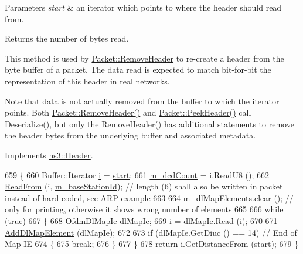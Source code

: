\begin{DoxyParams}{Parameters}
{\em start} & an iterator which points to where the header should read from. \\
\hline
\end{DoxyParams}
\begin{DoxyReturn}{Returns}
the number of bytes read.
\end{DoxyReturn}
This method is used by \hyperlink{classns3_1_1Packet_a0961eccf975d75f902d40956c93ba63e}{Packet\+::\+Remove\+Header} to re-\/create a header from the byte buffer of a packet. The data read is expected to match bit-\/for-\/bit the representation of this header in real networks.

Note that data is not actually removed from the buffer to which the iterator points. Both \hyperlink{classns3_1_1Packet_a0961eccf975d75f902d40956c93ba63e}{Packet\+::\+Remove\+Header()} and \hyperlink{classns3_1_1Packet_aadc63487bea70945c418f4c3e9b81964}{Packet\+::\+Peek\+Header()} call \hyperlink{classns3_1_1DlMap_a32304809baa42509928e641226100b98}{Deserialize()}, but only the Remove\+Header() has additional statements to remove the header bytes from the underlying buffer and associated metadata. 

Implements \hyperlink{classns3_1_1Header_a78be9400bb66b2a8543606f395ef5396}{ns3\+::\+Header}.


\begin{DoxyCode}
659 \{
660   Buffer::Iterator \hyperlink{bernuolliDistribution_8m_a6f6ccfcf58b31cb6412107d9d5281426}{i} = \hyperlink{namespacevisualizer_1_1core_a2a35e5d8a34af358b508dac8635754e0}{start};
661   \hyperlink{classns3_1_1DlMap_a631acfeb23dc7ce671cc115045d93d46}{m\_dcdCount} = i.ReadU8 ();
662   \hyperlink{namespacens3_aeeba9f1570f031f9e401f76f51943805}{ReadFrom} (i, \hyperlink{classns3_1_1DlMap_ad5d3b24b4d6cc443d13914c16240ab35}{m\_baseStationId}); \textcolor{comment}{// length (6) shall also be written in packet
       instead of hard coded, see ARP example}
663 
664   \hyperlink{classns3_1_1DlMap_a40f1f91916deac28501881ac057ecfab}{m\_dlMapElements}.clear (); \textcolor{comment}{// only for printing, otherwise it shows wrong number of
       elements}
665 
666   \textcolor{keywordflow}{while} (\textcolor{keyword}{true})
667     \{
668       OfdmDlMapIe dlMapIe;
669       i = dlMapIe.Read (i);
670 
671       \hyperlink{classns3_1_1DlMap_a169be40fb4ee59c8ac8ee601974440c6}{AddDlMapElement} (dlMapIe);
672 
673       \textcolor{keywordflow}{if} (dlMapIe.GetDiuc () == 14) \textcolor{comment}{// End of Map IE}
674         \{
675           \textcolor{keywordflow}{break};
676         \}
677     \}
678   \textcolor{keywordflow}{return} i.GetDistanceFrom (\hyperlink{namespacevisualizer_1_1core_a2a35e5d8a34af358b508dac8635754e0}{start});
679 \}
\end{DoxyCode}


